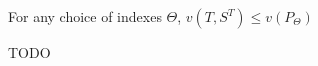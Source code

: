 \documentclass[letterpaper,11pt]{article}
\begin{document}
\begin{proposition}
For any choice of indexes $\Theta$, $v(T,S^T)\leq v(P_\Theta)$	
\end{proposition}

\begin{definition}
	TODO
\end{definition}



\end{document}
